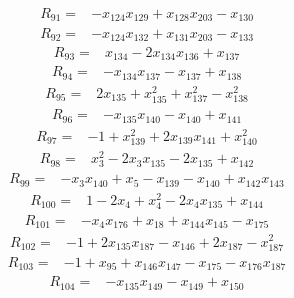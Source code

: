 \begin{align*}
R_{91}={}&-x_{124}x_{129}+x_{128}x_{203}-x_{130}
\end{align*}
\begin{align*}
R_{92}={}&-x_{124}x_{132}+x_{131}x_{203}-x_{133}
\end{align*}
\begin{align*}
R_{93}={}&x_{134}-2x_{134}x_{136}+x_{137}
\end{align*}
\begin{align*}
R_{94}={}&-x_{134}x_{137}-x_{137}+x_{138}
\end{align*}
\begin{align*}
R_{95}={}&2x_{135}+x_{135}^{2}+x_{137}^{2}-x_{138}^{2}
\end{align*}
\begin{align*}
R_{96}={}&-x_{135}x_{140}-x_{140}+x_{141}
\end{align*}
\begin{align*}
R_{97}={}&-1+x_{139}^{2}+2x_{139}x_{141}+x_{140}^{2}
\end{align*}
\begin{align*}
R_{98}={}&x_{3}^{2}-2x_{3}x_{135}-2x_{135}+x_{142}
\end{align*}
\begin{align*}
R_{99}={}&-x_{3}x_{140}+x_{5}-x_{139}-x_{140}+x_{142}x_{143}
\end{align*}
\begin{align*}
R_{100}={}&1-2x_{4}+x_{4}^{2}-2x_{4}x_{135}+x_{144}
\end{align*}
\begin{align*}
R_{101}={}&-x_{4}x_{176}+x_{18}+x_{144}x_{145}-x_{175}
\end{align*}
\begin{align*}
R_{102}={}&-1+2x_{135}x_{187}-x_{146}+2x_{187}-x_{187}^{2}
\end{align*}
\begin{align*}
R_{103}={}&-1+x_{95}+x_{146}x_{147}-x_{175}-x_{176}x_{187}
\end{align*}
\begin{align*}
R_{104}={}&-x_{135}x_{149}-x_{149}+x_{150}
\end{align*}
